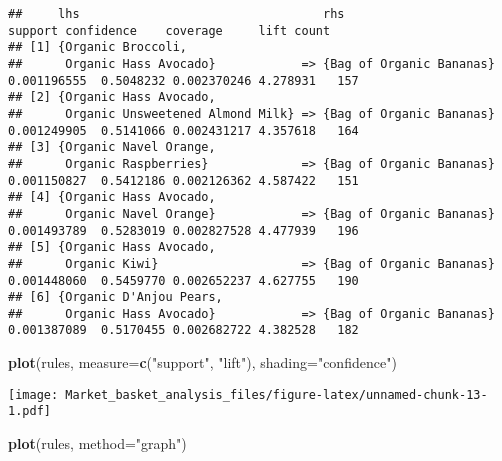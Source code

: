 \documentclass[
]{article}
\newenvironment{Shaded}{\begin{snugshade}}{\end{snugshade}}
\newcommand{\AttributeTok}[1]{\textcolor[rgb]{0.13,0.29,0.53}{#1}}
\newcommand{\FunctionTok}[1]{\textcolor[rgb]{0.13,0.29,0.53}{\textbf{#1}}}
\newcommand{\NormalTok}[1]{#1}
\newcommand{\StringTok}[1]{\textcolor[rgb]{0.31,0.60,0.02}{#1}}
\begin{document}
\begin{verbatim}
##     lhs                                  rhs                          support confidence    coverage     lift count
## [1] {Organic Broccoli,                                                                                             
##      Organic Hass Avocado}            => {Bag of Organic Bananas} 0.001196555  0.5048232 0.002370246 4.278931   157
## [2] {Organic Hass Avocado,                                                                                         
##      Organic Unsweetened Almond Milk} => {Bag of Organic Bananas} 0.001249905  0.5141066 0.002431217 4.357618   164
## [3] {Organic Navel Orange,                                                                                         
##      Organic Raspberries}             => {Bag of Organic Bananas} 0.001150827  0.5412186 0.002126362 4.587422   151
## [4] {Organic Hass Avocado,                                                                                         
##      Organic Navel Orange}            => {Bag of Organic Bananas} 0.001493789  0.5283019 0.002827528 4.477939   196
## [5] {Organic Hass Avocado,                                                                                         
##      Organic Kiwi}                    => {Bag of Organic Bananas} 0.001448060  0.5459770 0.002652237 4.627755   190
## [6] {Organic D'Anjou Pears,                                                                                        
##      Organic Hass Avocado}            => {Bag of Organic Bananas} 0.001387089  0.5170455 0.002682722 4.382528   182
\end{verbatim}

\begin{Shaded}
\begin{Highlighting}[]
\FunctionTok{plot}\NormalTok{(rules, }\AttributeTok{measure=}\FunctionTok{c}\NormalTok{(}\StringTok{"support"}\NormalTok{, }\StringTok{"lift"}\NormalTok{), }\AttributeTok{shading=}\StringTok{"confidence"}\NormalTok{)}
\end{Highlighting}
\end{Shaded}

\texttt{[image: Market\_basket\_analysis\_files/figure-latex/unnamed-chunk-13-1.pdf]}

\begin{Shaded}
\begin{Highlighting}[]
\FunctionTok{plot}\NormalTok{(rules, }\AttributeTok{method=}\StringTok{"graph"}\NormalTok{)}
\end{Highlighting}
\end{Shaded}
\end{document}
